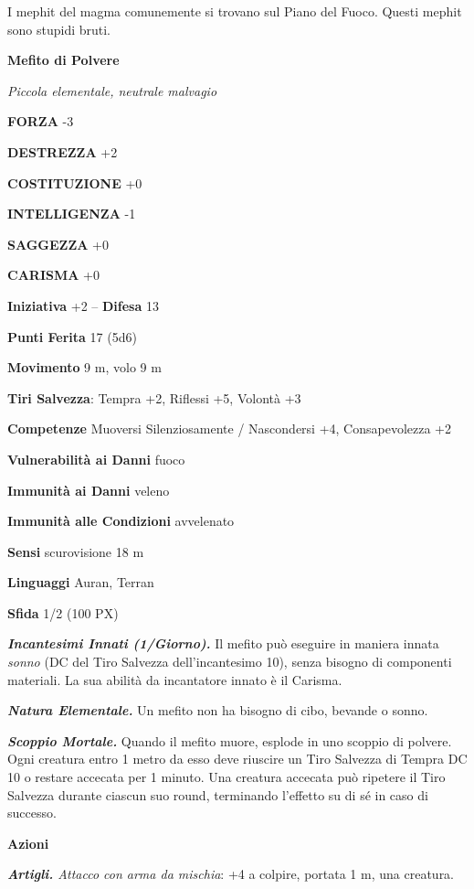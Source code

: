 \begin{multicols}{2}
I mephit del magma comunemente si trovano sul Piano del Fuoco. Questi mephit sono stupidi bruti.


\medskip{}\textbf{Mefito di Polvere}

\textit{Piccola elementale, neutrale malvagio}

\textbf{FORZA} -3

\textbf{DESTREZZA} +2

\textbf{COSTITUZIONE} +0

\textbf{INTELLIGENZA} -1

\textbf{SAGGEZZA} +0

\textbf{CARISMA} +0

\textbf{Iniziativa} +2 -- \textbf{Difesa} 13

\textbf{Punti Ferita} 17 (5d6)

\textbf{Movimento} 9 m, volo 9 m

\textbf{Tiri Salvezza}: Tempra +2, Riflessi +5, Volontà +3

\textbf{Competenze} Muoversi Silenziosamente / Nascondersi +4, Consapevolezza +2

\textbf{Vulnerabilità ai Danni} fuoco

\textbf{Immunità ai Danni} veleno

\textbf{Immunità alle Condizioni} avvelenato

\textbf{Sensi} scurovisione 18 m

\textbf{Linguaggi} Auran, Terran

\textbf{Sfida} 1/2 (100 PX)

\textit{\textbf{Incantesimi Innati (1/Giorno).}} Il mefito può eseguire in maniera innata \textit{sonno} (DC del Tiro Salvezza dell'incantesimo 10), senza bisogno di componenti materiali. La sua abilità da incantatore innato è il Carisma.

\textit{\textbf{Natura Elementale.}} Un mefito non ha bisogno di cibo, bevande o sonno.

\textit{\textbf{Scoppio Mortale.}} Quando il mefito muore, esplode in uno scoppio di polvere. Ogni creatura entro 1 metro da esso deve riuscire un Tiro Salvezza di Tempra DC 10 o restare accecata per 1 minuto. Una creatura accecata può ripetere il Tiro Salvezza durante ciascun suo round, terminando l'effetto su di sé in caso di successo.

\textbf{Azioni}

\textit{\textbf{Artigli.} Attacco con arma da mischia}: +4 a colpire, portata 1 m, una creatura.


\end{multicols}
